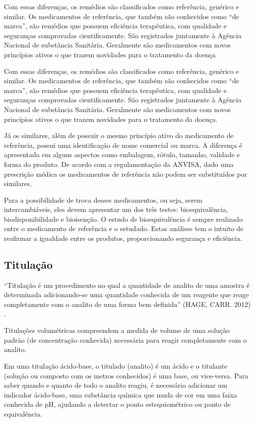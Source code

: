 Com essas diferenças, os remédios são classificados como referência, genérico e similar. Os medicamentos
de referência, que também são conhecidos como “de marca”, são remédios que possuem eficiência
terapêutica, com qualidade e seguranças comprovadas cientificamente. São registrados juntamente à Agência
Nacional de substância Sanitária. Geralmente são medicamentos com novos princípios ativos o que trazem
novidades para o tratamento da doença

Com essas diferenças, os remédios são classificados como referência, genérico e similar. Os medicamentos
de referência, que também são conhecidos como “de marca”, são remédios que possuem eficiência
terapêutica, com qualidade e seguranças comprovadas cientificamente. São registrados juntamente à Agência
Nacional de substância Sanitária. Geralmente são medicamentos com novos princípios ativos o que trazem
novidades para o tratamento da doença.

Já os similares, além de possuir o mesmo princípio ativo do medicamento de referência, possui uma
identificação de nome comercial ou marca. A diferença é apresentada em alguns aspectos como embalagem,
rótulo, tamanho, validade e forma do produto. De acordo com a regulamentação da ANVISA, dado uma
prescrição médica os medicamentos de referência não podem ser substituídos por similares.

Para a possibilidade de troca desses medicamentos, ou seja, serem intercambiáveis, eles devem apresentar
um dos três testes: bioequivalência, biodisponibilidade e bioisenção. O estudo de bioequivalência é
sempre realizado entre o medicamento de referência e o estudado. Estas análises tem o intuito de
reafirmar a igualdade entre os produtos, proporcionando segurança e eficiência. \cite{ache2015}

\subsection{Titulação}\label{titulacao}

``Titulação é um procedimento no qual a quantidade de analito de uma amostra é determinada
adicionando-se uma quantidade conhecida de um reagente que reage completamente com o analito de
uma forma bem definida'' (HAGE, CARR. 2012) \cite{Hage2012}.

Titulações volumétricas compreendem a medida de volume de uma solução padrão (de concentração
conhecida) necessária para reagir completamente com o analito. \cite{Skoog2014}

Em uma titulação ácido-base, o titulado (analito) é um ácido e o titulante (solução ou composto com
os metros conhecidos) é uma base, ou vice-versa. Para saber quando e quanto de todo o analito
reagiu, é necessário adicionar um indicador ácido-base, uma substância química que muda de cor em uma
faixa conhecida de pH, ajudando a detectar o ponto estequiométrico ou ponto de equivalência.

